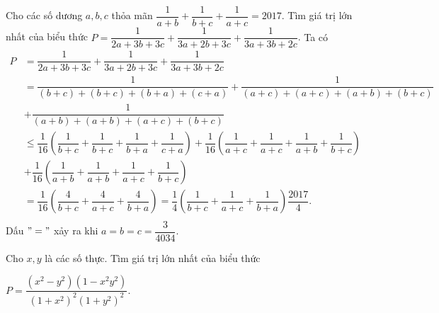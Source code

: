 \begin{bt}%
	Cho các số dương $a, b, c$ thỏa mãn $\dfrac{1}{a+b}+\dfrac{1}{b+c}+\dfrac{1}{a+c}=2017$. Tìm giá trị lớn nhất của biểu thức $P=\dfrac{1}{2a+3b+3c}+\dfrac{1}{3a+2b+3c}+\dfrac{1}{3a+3b+2c}$.
	\loigiai
	{
		Ta có\\
		$\begin{array}{ll}
		P & =\dfrac{1}{2a+3b+3c}+\dfrac{1}{3a+2b+3c}+\dfrac{1}{3a+3b+2c} \\
		&=\dfrac{1}{(b+c)+(b+c)+(b+a)+(c+a)}+\dfrac{1}{(a+c)+(a+c)+(a+b)+(b+c)} \\
		&+\dfrac{1}{(a+b)+(a+b)+(a+c)+(b+c)} \\
		&\leq\dfrac{1}{16}\left(\dfrac{1}{b+c}+\dfrac{1}{b+c}+\dfrac{1}{b+a}+\dfrac{1}{c+a}\right)+\dfrac{1}{16}\left(\dfrac{1}{a+c}+\dfrac{1}{a+c}+\dfrac{1}{a+b}+\dfrac{1}{b+c}\right) \\
		&+\dfrac{1}{16}\left(\dfrac{1}{a+b}+\dfrac{1}{a+b}+\dfrac{1}{a+c}+\dfrac{1}{b+c}\right) \\
		& =\dfrac{1}{16}\left(\dfrac{4}{b+c}+\dfrac{4}{a+c}+\dfrac{4}{b+a}\right)=\dfrac{1}{4}\left(\dfrac{1}{b+c}+\dfrac{1}{a+c}+\dfrac{1}{b+a}\right)\dfrac{2017}{4}.\\
		\end{array}$\\
		Dấu $"="$ xảy ra khi $a=b=c=\dfrac{3}{4034}.$
	}
\end{bt}

\begin{bt}%
	Cho $x,y$ là các số thực. Tìm giá trị lớn nhất của biểu thức
	\begin{center} $ P = \dfrac{(x^2-y^2)(1-x^2y^2)}{(1+x^2)^2(1+y^2)^2}.$
	\end{center}
\end{bt}


